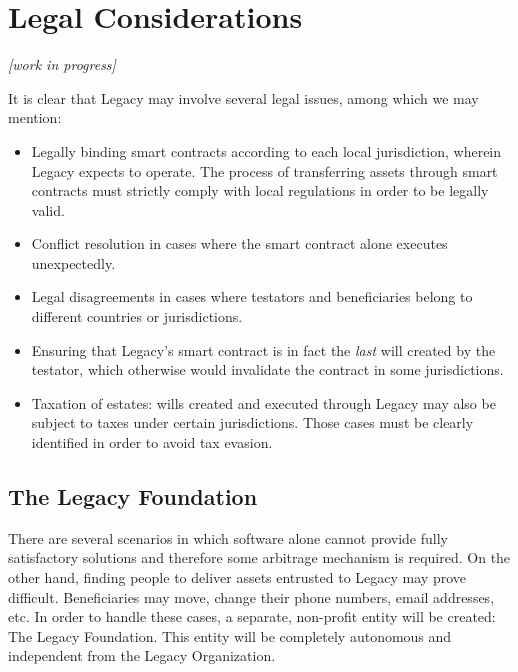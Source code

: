 \chapter{Legal Considerations} %
\label{cha:legal_considerations}

\textit{[work in progress]}

\vspace{4mm}

It is clear that Legacy may involve several legal issues, among which we may mention:

\begin{itemize}
	\item Legally binding smart contracts according to each local jurisdiction, wherein Legacy expects to operate. The process of transferring assets through smart contracts must strictly comply with local regulations in order to be legally valid.
	\item Conflict resolution in cases where the smart contract alone executes unexpectedly.
	\item Legal disagreements in cases where testators and beneficiaries belong to different countries or jurisdictions.
	\item Ensuring that Legacy's smart contract is in fact the \textit{last} will created by the testator, which otherwise would invalidate the contract in some jurisdictions.
	\item Taxation of estates: wills created and executed through Legacy may also be subject to taxes under certain jurisdictions. Those cases must be clearly identified in order to avoid tax evasion.
\end{itemize}


\section{The Legacy Foundation} %
\label{sec:the_legacy_foundation}

There are several scenarios in which software alone cannot provide fully satisfactory solutions and therefore some arbitrage mechanism is required.
On the other hand, finding people to deliver assets entrusted to Legacy may prove difficult. Beneficiaries may move, change their phone numbers, email addresses, etc.
In order to handle these cases, a separate, non-profit entity will be created: The Legacy Foundation. This entity will be completely autonomous and independent from the Legacy Organization.

